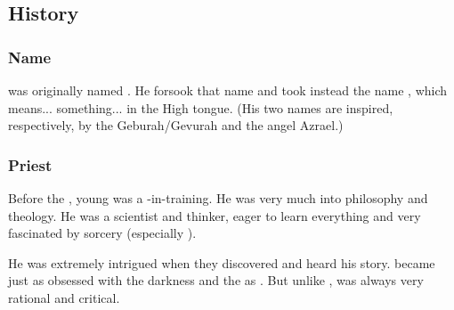 









\subsection{History}





\subsubsection{Name}
\Azraid was originally named \Gevural.
He forsook that name and took instead the name \Azraid, which means... something... in the High \Resphan{} tongue. 
(His two names are inspired, respectively, by the \Sephirah{} Geburah/Gevurah and the angel Azrael.)






\subsubsection{Priest}
Before the , young \Gevural{} was a -in-training. 
He was very much into philosophy and theology. 
He was a scientist and thinker, eager to learn everything and very fascinated by sorcery (especially ).

He was extremely intrigued when they discovered \Semiza{} and heard his story. 
\Gevural{} became just as obsessed with the darkness and the \banes{} as \Zachirah. 
But unlike \Zachirah, \Gevural{} was always very rational and critical. 

